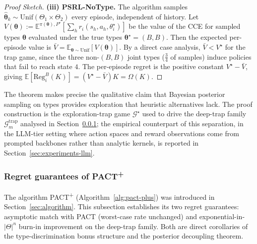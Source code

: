 \begin{proof}[Proof Sketch]
\textbf{(iii) PSRL-NoType.} The algorithm samples $\hat{\boldsymbol{\theta}}_k \sim \mathrm{Unif}(\Theta_1 \times \Theta_2)$ every episode, independent of history. Let $V(\boldsymbol{\theta}) := \mathbb{E}^{\pi(\boldsymbol{\theta}), P^\star}[\sum_h r_i(s_h, a_h, \theta_i^\star)]$ be the value of the CCE for sampled types $\boldsymbol{\theta}$ evaluated under the true types $\boldsymbol{\theta}^\star = (B, B)$. Then the expected per-episode value is $\bar V = \mathbb{E}_{\boldsymbol{\theta} \sim \mathrm{Unif}}[V(\boldsymbol{\theta})]$. By a direct case analysis, $\bar V < V^\star$ for the trap game, since the three non-$(B,B)$ joint types ($\frac{3}{4}$ of samples) induce policies that fail to reach state $4$. The per-episode regret is the positive constant $V^\star - \bar V$, giving $\mathbb{E}[\mathrm{Reg}_i^B(K)] = (V^\star - \bar V) K = \Omega(K)$.
\end{proof}

The theorem makes precise the qualitative claim that Bayesian posterior sampling on types provides exploration that heuristic alternatives lack. The proof construction is the exploration-trap game $\mathcal{G}^\star$ used to drive the deep-trap family $\mathcal{G}_m^{\mathrm{trap}}$ analysed in Section~\ref{sec:pact-plus}; the empirical counterpart of this separation, in the LLM-tier setting where action spaces and reward observations come from prompted backbones rather than analytic kernels, is reported in Section~\ref{sec:experiments-llm}.

\subsubsection{Regret guarantees of PACT\textsuperscript{+}}
\label{sec:pact-plus}

The algorithm PACT\textsuperscript{+} (Algorithm~\ref{alg:pact-plus}) was introduced in Section~\ref{sec:algorithm}. This subsection establishes its two regret guarantees: asymptotic match with PACT (worst-case rate unchanged) and exponential-in-$|\Theta|^n$ burn-in improvement on the deep-trap family. Both are direct corollaries of the type-discrimination bonus structure and the posterior decoupling theorem.

